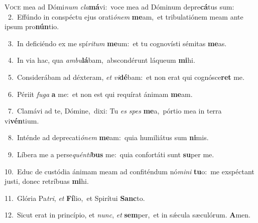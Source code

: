 \lettrine{\initial\textcolor{\initialcolor}{V}}{oce} mea ad Dómi\textit{num} \textit{cla}\-\textbf{má}vi:~\star voce mea ad Dóminum depre\-\textbf{cá}\-tus sum:\\
{\numbfont\textcolor{\numbcolor}{~2.}}~Effúndo in conspéctu ejus orati\-\textit{ó}\-\textit{nem} \textbf{me}\-am,~\star et tribulatiónem meam ante ipsum pro\-\textbf{nún}\-tio.\par
{\numbfont\textcolor{\numbcolor}{~3.}}~In deficiéndo ex me spí\-\textit{ri}\-\textit{tum} \textbf{me}\-um:~\star et tu cognovísti sémitas \textbf{me}\-as.\par
{\numbfont\textcolor{\numbcolor}{~4.}}~In via hac, qua \textit{am}\-\textit{bu}\textbf{lá}bam,~\star abscondérunt láqueum \textbf{mi}\-hi.\par
{\numbfont\textcolor{\numbcolor}{~5.}}~Considerábam ad déxteram, \textit{et} \textit{vi}\-\textbf{dé}bam:~\star et non erat qui cognósce\textbf{ret} me.\par
{\numbfont\textcolor{\numbcolor}{~6.}}~Périit \textit{fu}\-\textit{ga} \textbf{a} me:~\star et non est qui requírat ánimam \textbf{me}\-am.\par
{\numbfont\textcolor{\numbcolor}{~7.}}~Clamávi ad te, Dómine,~\dagger dixi: Tu \textit{es} \textit{spes} \textbf{me}\-a,~\star pórtio mea in terra vi\-\textbf{vén}\-tium.\par
{\numbfont\textcolor{\numbcolor}{~8.}}~Inténde ad deprecati\-\textit{ó}\-\textit{nem} \textbf{me}\-am:~\star quia humiliátus sum \textbf{ni}\-mis.\par
{\numbfont\textcolor{\numbcolor}{~9.}}~Líbera me a perse\-\textit{quén}\-\textit{ti}\textbf{bus} me:~\star quia confortáti sunt \textbf{su}\-per me.\par
{\numbfont\textcolor{\numbcolor}{10.}}~Educ de custódia ánimam meam ad confiténdum nó\-\textit{mi}\-\textit{ni} \textbf{tu}\-o:~\star me exspéctant justi, donec retríbuas \textbf{mi}\-hi.\par
{\numbfont\textcolor{\numbcolor}{11.}}~Glória Pa\-\textit{tri}\-, \textit{et} \textbf{Fí}\-lio,~\star et Spirítui \textbf{Sanc}\-to.\par
{\numbfont\textcolor{\numbcolor}{12.}}~Sicut erat in princípio, et \textit{nunc}\-, \textit{et} \textbf{sem}\-per,~\star et in sǽcula sæculórum. \textbf{A}\-men.\par
